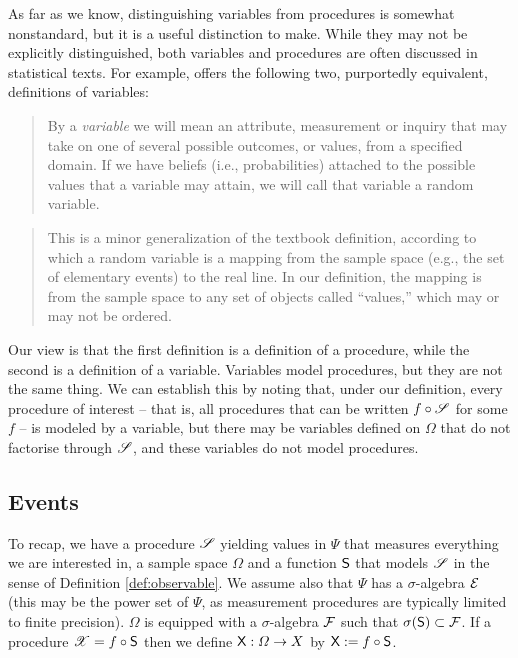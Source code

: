 As far as we know, distinguishing variables from procedures is somewhat nonstandard, but it is a useful distinction to make. While they may not be explicitly distinguished, both variables and procedures are often discussed in statistical texts. For example, \citet{pearl_causality:_2009} offers the following two, purportedly equivalent, definitions of variables:
\begin{quote}
By a \emph{variable} we will mean an attribute, measurement or inquiry that may take on one of several possible outcomes, or values, from a specified domain. If we have beliefs (i.e., probabilities) attached to the possible values that a variable may attain, we will call that variable a random variable.
\end{quote}

\begin{quote}
This is a minor generalization of the textbook definition, according to which a random variable is a mapping from the sample space (e.g., the set of elementary events) to the real line. In our definition, the mapping is from the sample space to any set of objects called ``values,'' which may or may not be ordered.
\end{quote}

Our view is that the first definition is a definition of a procedure, while the second is a definition of a variable. Variables model procedures, but they are not the same thing. We can establish this by noting that, under our definition, every procedure of interest -- that is, all procedures that can be written $f\circ \mathscr{S}$ for some $f$ -- is modeled by a variable, but there may be variables defined on $\Omega$ that do not factorise through $\mathscr{S}$, and these variables do not model procedures.

\subsection{Events}

To recap, we have a procedure $\mathscr{S}$ yielding values in $\Psi$ that measures everything we are interested in, a sample space $\Omega$ and a function $\mathsf{S}$ that models $\mathscr{S}$ in the sense of Definition \ref{def:observable}. We assume also that $\Psi$ has a $\sigma$-algebra $\mathcal{E}$ (this may be the power set of $\Psi$, as measurement procedures are typically limited to finite precision). $\Omega$ is equipped with a $\sigma$-algebra $\mathcal{F}$ such that $\sigma(\mathsf{S})\subset \mathcal{F}$. If a procedure $\mathscr{X}=f\circ \mathsf{S}$ then we define $\mathsf{X}:\Omega\to X$ by $\mathsf{X}:=f\circ\mathsf{S}$.

